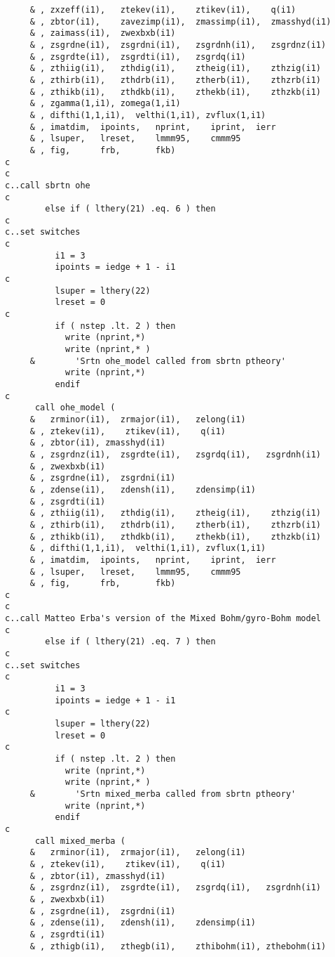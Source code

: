 \begin{verbatim}
     & , zxzeff(i1),   ztekev(i1),    ztikev(i1),    q(i1)
     & , zbtor(i1),    zavezimp(i1),  zmassimp(i1),  zmasshyd(i1)
     & , zaimass(i1),  zwexbxb(i1)
     & , zsgrdne(i1),  zsgrdni(i1),   zsgrdnh(i1),   zsgrdnz(i1)
     & , zsgrdte(i1),  zsgrdti(i1),   zsgrdq(i1)
     & , zthiig(i1),   zthdig(i1),    ztheig(i1),    zthzig(i1)
     & , zthirb(i1),   zthdrb(i1),    ztherb(i1),    zthzrb(i1)
     & , zthikb(i1),   zthdkb(i1),    zthekb(i1),    zthzkb(i1)
     & , zgamma(1,i1), zomega(1,i1)
     & , difthi(1,1,i1),  velthi(1,i1), zvflux(1,i1)
     & , imatdim,  ipoints,   nprint,    iprint,  ierr
     & , lsuper,   lreset,    lmmm95,    cmmm95
     & , fig,      frb,       fkb)
c
c
c..call sbrtn ohe
c
        else if ( lthery(21) .eq. 6 ) then
c
c..set switches
c
          i1 = 3
          ipoints = iedge + 1 - i1
c
          lsuper = lthery(22)
          lreset = 0
c
          if ( nstep .lt. 2 ) then
            write (nprint,*)
            write (nprint,* )
     &        'Srtn ohe_model called from sbrtn ptheory'
            write (nprint,*)
          endif
c
      call ohe_model (
     &   zrminor(i1),  zrmajor(i1),   zelong(i1)
     & , ztekev(i1),    ztikev(i1),    q(i1)
     & , zbtor(i1), zmasshyd(i1)
     & , zsgrdnz(i1),  zsgrdte(i1),   zsgrdq(i1),   zsgrdnh(i1)
     & , zwexbxb(i1)
     & , zsgrdne(i1),  zsgrdni(i1)
     & , zdense(i1),   zdensh(i1),    zdensimp(i1)
     & , zsgrdti(i1)
     & , zthiig(i1),   zthdig(i1),    ztheig(i1),    zthzig(i1)
     & , zthirb(i1),   zthdrb(i1),    ztherb(i1),    zthzrb(i1)
     & , zthikb(i1),   zthdkb(i1),    zthekb(i1),    zthzkb(i1)
     & , difthi(1,1,i1),  velthi(1,i1), zvflux(1,i1)
     & , imatdim,  ipoints,   nprint,    iprint,  ierr
     & , lsuper,   lreset,    lmmm95,    cmmm95
     & , fig,      frb,       fkb)
c
c
c..call Matteo Erba's version of the Mixed Bohm/gyro-Bohm model
c
        else if ( lthery(21) .eq. 7 ) then
c
c..set switches
c
          i1 = 3
          ipoints = iedge + 1 - i1
c
          lsuper = lthery(22)
          lreset = 0
c
          if ( nstep .lt. 2 ) then
            write (nprint,*)
            write (nprint,* )
     &        'Srtn mixed_merba called from sbrtn ptheory'
            write (nprint,*)
          endif
c
      call mixed_merba (
     &   zrminor(i1),  zrmajor(i1),   zelong(i1)
     & , ztekev(i1),    ztikev(i1),    q(i1)
     & , zbtor(i1), zmasshyd(i1)
     & , zsgrdnz(i1),  zsgrdte(i1),   zsgrdq(i1),   zsgrdnh(i1)
     & , zwexbxb(i1)
     & , zsgrdne(i1),  zsgrdni(i1)
     & , zdense(i1),   zdensh(i1),    zdensimp(i1)
     & , zsgrdti(i1)
     & , zthigb(i1),   zthegb(i1),    zthibohm(i1), zthebohm(i1)

\end{verbatim}
